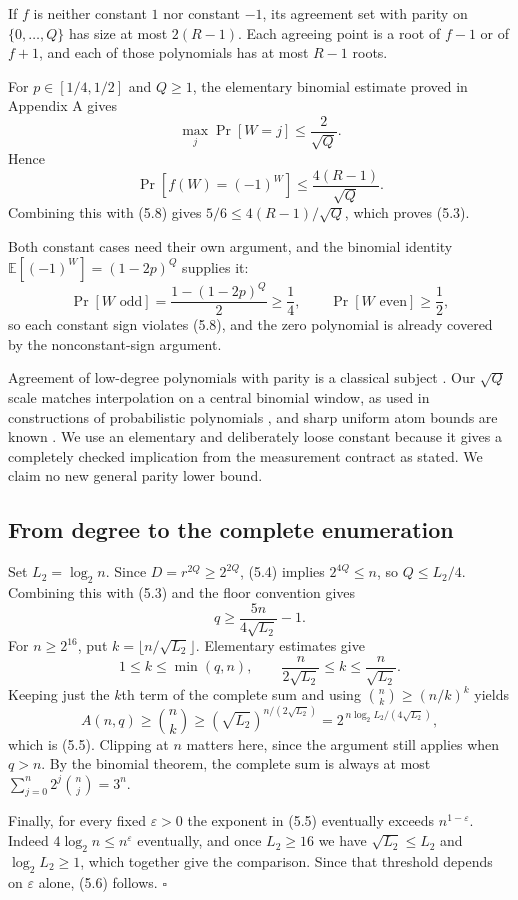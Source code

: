 \documentclass[11pt,letterpaper]{article}
\begin{document}
If \(f\) is neither constant \(1\) nor constant \(-1\), its agreement
set with parity on \(\{0,\ldots,Q\}\) has size at most \(2(R-1)\). Each
agreeing point is a root of \(f-1\) or of \(f+1\), and each of those
polynomials has at most \(R-1\) roots.

For \(p\in[1/4,1/2]\) and \(Q\ge1\), the elementary binomial estimate
proved in Appendix A gives \[\max_j\Pr[W=j]\le\frac2{\sqrt Q}.\] Hence
\[\Pr[f(W)=(-1)^W]\le\frac{4(R-1)}{\sqrt Q}.\] Combining this with (5.8)
gives \(5/6\le4(R-1)/\sqrt Q\), which proves (5.3).

Both constant cases need their own argument, and the binomial identity
\(\mathbb E[(-1)^W]=(1-2p)^Q\) supplies it:
\[\Pr[W\text{ odd}]=\frac{1-(1-2p)^Q}{2}\ge\frac14,
\qquad
\Pr[W\text{ even}]\ge\frac12,\] so each constant sign violates (5.8),
and the zero polynomial is already covered by the nonconstant-sign
argument.

Agreement of low-degree polynomials with parity is a classical subject
\citep{ABFR94}. Our \(\sqrt Q\) scale matches interpolation on a central
binomial window, as used in constructions of probabilistic polynomials
\citep{AW15}, and sharp uniform atom bounds are known \citep{BCV16}. We
use an elementary and deliberately loose constant because it gives a
completely checked implication from the measurement contract as stated.
We claim no new general parity lower bound.

\subsection{From degree to the complete
enumeration}\label{from-degree-to-the-complete-enumeration}

Set \(L_2=\log_2 n\). Since \(D=r^{2Q}\ge2^{2Q}\), (5.4) implies
\(2^{4Q}\le n\), so \(Q\le L_2/4\). Combining this with (5.3) and the
floor convention gives \[q\ge\frac{5n}{4\sqrt{L_2}}-1.\] For
\(n\ge2^{16}\), put \(k=\lfloor n/\sqrt{L_2}\rfloor\). Elementary
estimates give \[1\le k\le\min(q,n),
\qquad
\frac{n}{2\sqrt{L_2}}\le k\le\frac n{\sqrt{L_2}}.\] Keeping just the
\(k\)th term of the complete sum and using \(\binom nk\ge(n/k)^k\)
yields \[A(n,q)\ge\binom nk
 \ge\left(\sqrt{L_2}\right)^{n/(2\sqrt{L_2})}
 =2^{\,n\log_2 L_2/(4\sqrt{L_2})},\] which is (5.5). Clipping at \(n\)
matters here, since the argument still applies when \(q>n\). By the
binomial theorem, the complete sum is always at most
\(\sum_{j=0}^n2^j\binom nj=3^n\).

Finally, for every fixed \(\varepsilon>0\) the exponent in (5.5)
eventually exceeds \(n^{1-\varepsilon}\). Indeed
\(4\log_2 n\le n^\varepsilon\) eventually, and once \(L_2\ge16\) we have
\(\sqrt{L_2}\le L_2\) and \(\log_2 L_2\ge1\), which together give the
comparison. Since that threshold depends on \(\varepsilon\) alone, (5.6)
follows. \(\square\)
\end{document}

